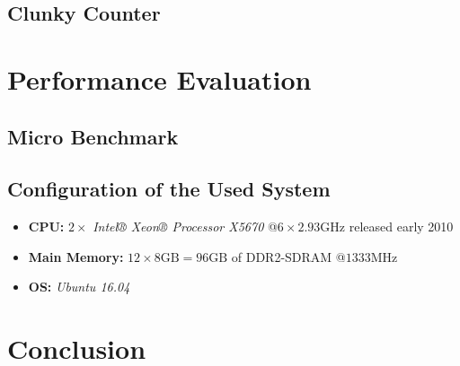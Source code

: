\subsection[Clunky Counter]{Clunky Counter} \label{subsec:clunky_counter}

\section[Performance Evaluation]{Performance Evaluation} \label{sec:loop-performance}

\subsection[Micro Benchmark]{Micro Benchmark}

\subsection[System Configuration]{Configuration of the Used System}

\begin{@empty}
    \begin{itemize}
        \itemsep0em
        \item \textbf{CPU:} $2 \times $ \emph{Intel® Xeon® Processor X5670} @$6 \times 2.93\text{GHz}$ released early 2010
        \item \textbf{Main Memory:} $12 \times 8\text{GB} = 96\text{GB}$ of DDR2-SDRAM @$1333\text{MHz}$
        \item \textbf{OS:} \emph{Ubuntu 16.04}
    \end{itemize}
\end{@empty}

\section{Conclusion}
